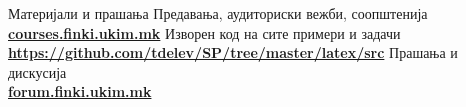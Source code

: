 \begin{frame}{Материјали и прашања}{}
    Предавања, аудиториски вежби, соопштенија\\
    \href{http://courses.finki.ukim.mk/}{\textbf{courses.finki.ukim.mk}}
    \vfill
    Изворен код на сите примери и задачи\\
    \href{https://github.com/tdelev/SP/tree/master/latex/src}{\textbf{https://github.com/tdelev/SP/tree/master/latex/src}}
    \vfill
    Прашања и дискусија\\
    \href{http://forum.finki.ukim.mk}{\textbf{forum.finki.ukim.mk}}
\end{frame}

